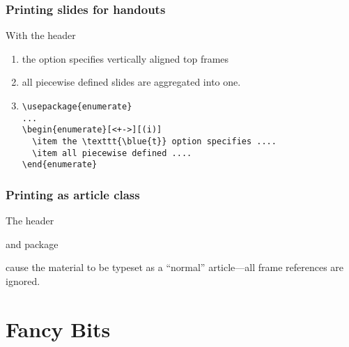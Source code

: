\begin{frame}[fragile]
  \frametitle{Printing slides for handouts}

With the header

 {}

\begin{enumerate}[<+->][(i)]
\item the \texttt{} option specifies vertically aligned top frames
\item all piecewise defined slides are aggregated into one.

\item
\begin{verbatim}
\usepackage{enumerate}
...
\begin{enumerate}[<+->][(i)]
  \item the \texttt{\blue{t}} option specifies ....
  \item all piecewise defined ....
\end{enumerate}
\end{verbatim}
\end{enumerate}


\end{frame}


\begin{frame}
   \frametitle{Printing as article class}
 
The header

 {}
 
 and package
 
 {}
 
cause the material to be typeset as a ``normal'' article---all frame references are ignored.
 \end{frame}
 
\section{Fancy Bits}

